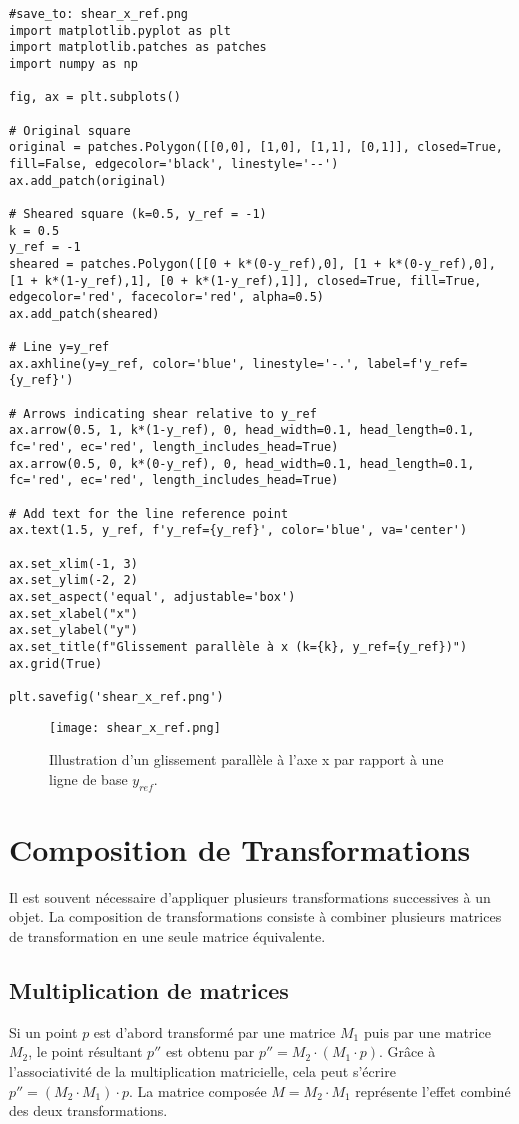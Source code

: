 \documentclass{article}
\begin{document}
\begin{verbatim}
#save_to: shear_x_ref.png
import matplotlib.pyplot as plt
import matplotlib.patches as patches
import numpy as np

fig, ax = plt.subplots()

# Original square
original = patches.Polygon([[0,0], [1,0], [1,1], [0,1]], closed=True, fill=False, edgecolor='black', linestyle='--')
ax.add_patch(original)

# Sheared square (k=0.5, y_ref = -1)
k = 0.5
y_ref = -1
sheared = patches.Polygon([[0 + k*(0-y_ref),0], [1 + k*(0-y_ref),0], [1 + k*(1-y_ref),1], [0 + k*(1-y_ref),1]], closed=True, fill=True, edgecolor='red', facecolor='red', alpha=0.5)
ax.add_patch(sheared)

# Line y=y_ref
ax.axhline(y=y_ref, color='blue', linestyle='-.', label=f'y_ref={y_ref}')

# Arrows indicating shear relative to y_ref
ax.arrow(0.5, 1, k*(1-y_ref), 0, head_width=0.1, head_length=0.1, fc='red', ec='red', length_includes_head=True)
ax.arrow(0.5, 0, k*(0-y_ref), 0, head_width=0.1, head_length=0.1, fc='red', ec='red', length_includes_head=True)

# Add text for the line reference point
ax.text(1.5, y_ref, f'y_ref={y_ref}', color='blue', va='center')

ax.set_xlim(-1, 3)
ax.set_ylim(-2, 2)
ax.set_aspect('equal', adjustable='box')
ax.set_xlabel("x")
ax.set_ylabel("y")
ax.set_title(f"Glissement parallèle à x (k={k}, y_ref={y_ref})")
ax.grid(True)

plt.savefig('shear_x_ref.png')
\end{verbatim}

\begin{figure}[H]
\centering
\texttt{[image: shear\_x\_ref.png]}
\caption{Illustration d'un glissement parallèle à l'axe x par rapport à une ligne de base $y_{ref}$.}
\label{fig:shear_x_ref}
\end{figure}

\section{Composition de Transformations}

Il est souvent nécessaire d'appliquer plusieurs transformations successives à un objet. La composition de transformations consiste à combiner plusieurs matrices de transformation en une seule matrice équivalente.

\subsection{Multiplication de matrices}
Si un point $p$ est d'abord transformé par une matrice $M_1$ puis par une matrice $M_2$, le point résultant $p''$ est obtenu par $p'' = M_2 \cdot (M_1 \cdot p)$. Grâce à l'associativité de la multiplication matricielle, cela peut s'écrire $p'' = (M_2 \cdot M_1) \cdot p$. La matrice composée $M = M_2 \cdot M_1$ représente l'effet combiné des deux transformations.
\end{document}
